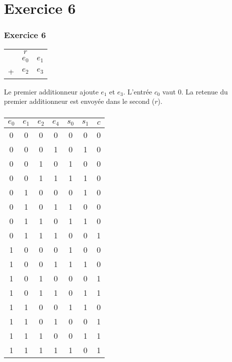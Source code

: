 \documentclass[svgnames,11pt]{beamer}
\begin{document}
\section{Exercice 6}
\begin{frame}
    \frametitle{Exercice 6}
{\Large
    \begin{center}
        \begin{tabular}{ccc}
            &$r$&\\
              & $e_0$ & $e_1$ \\
            + & $e_2$ & $e_3$ \\
        \end{tabular}
    \end{center}
}
Le premier additionneur ajoute $e_1$ et $e_3$. L'entrée $c_0$ vaut 0. La retenue du premier additionneur est envoyée dans le second ($r$).
\end{frame}
\begin{frame}
    \frametitle{}

    \begin{center}
        \begin{tabular}{|*4{c|}|*3{c|}}
        \hline 
        $e_0$ & $e_1$ & $e_2$ & $e_4$ & $s_0$ & $s_1$ & $c$ \\ 
        \hline 
        0 & 0 & 0 & 0 & 0 & 0 & 0 \\ 
        \hline 
        0 & 0 & 0 & 1 & 0 & 1 & 0 \\ 
        \hline
        0 & 0 & 1 & 0 & 1 & 0 & 0 \\ 
        \hline
        0 & 0 & 1 & 1 & 1 & 1 & 0 \\ 
        \hline
        0 & 1 & 0 & 0 & 0 & 1 & 0 \\ 
        \hline
        0 & 1 & 0 & 1 & 1 & 0 & 0 \\ 
        \hline
        0 & 1 & 1 & 0 & 1 & 1 & 0 \\ 
        \hline
        0 & 1 & 1 & 1 & 0 & 0 & 1 \\ 
        \hline
        1 & 0 & 0 & 0 & 1 & 0 & 0 \\ 
        \hline
        1 & 0 & 0 & 1 & 1 & 1 & 0 \\ 
        \hline
        1 & 0 & 1 & 0 & 0 & 0 & 1 \\ 
        \hline
        1 & 0 & 1 & 1 & 0 & 1 & 1 \\ 
        \hline
        1 & 1 & 0 & 0 & 1 & 1 & 0 \\ 
        \hline
        1 & 1 & 0 & 1 & 0 & 0 & 1 \\ 
        \hline
        1 & 1 & 1 & 0 & 0 & 1 & 1 \\ 
        \hline
        1 & 1 & 1 & 1 & 1 & 0 & 1 \\ 
        \hline
        \end{tabular}
        \end{center}

\end{frame}
\end{document}
